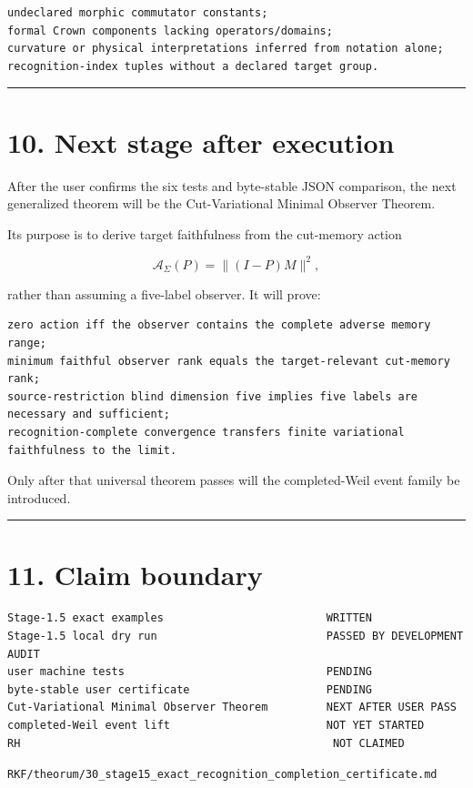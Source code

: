 \begin{verbatim}
undeclared morphic commutator constants;
formal Crown components lacking operators/domains;
curvature or physical interpretations inferred from notation alone;
recognition-index tuples without a declared target group.
\end{verbatim}

\begin{center}\rule{0.5\linewidth}{0.5pt}\end{center}

\hypertarget{next-stage-after-execution}{%
\section{10. Next stage after execution}\label{next-stage-after-execution}}

After the user confirms the six tests and byte-stable JSON comparison, the next generalized theorem will be the Cut-Variational Minimal Observer Theorem.

Its purpose is to derive target faithfulness from the cut-memory action

\[
\mathcal A_\Sigma(P)
=
\|(I-P)M\|^2,
\]

rather than assuming a five-label observer. It will prove:

\begin{verbatim}
zero action iff the observer contains the complete adverse memory range;
minimum faithful observer rank equals the target-relevant cut-memory rank;
source-restriction blind dimension five implies five labels are necessary and sufficient;
recognition-complete convergence transfers finite variational faithfulness to the limit.
\end{verbatim}

Only after that universal theorem passes will the completed-Weil event family be introduced.

\begin{center}\rule{0.5\linewidth}{0.5pt}\end{center}

\hypertarget{claim-boundary}{%
\section{11. Claim boundary}\label{claim-boundary}}

\begin{verbatim}
Stage-1.5 exact examples                         WRITTEN
Stage-1.5 local dry run                          PASSED BY DEVELOPMENT AUDIT
user machine tests                               PENDING
byte-stable user certificate                     PENDING
Cut-Variational Minimal Observer Theorem         NEXT AFTER USER PASS
completed-Weil event lift                        NOT YET STARTED
RH                                                NOT CLAIMED
\end{verbatim}

\begin{flushright}\small\texttt{RKF/theorum/30\_stage15\_exact\_recognition\_completion\_certificate.md}\end{flushright}
